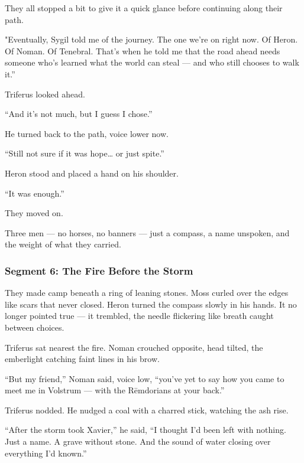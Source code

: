 \documentclass[9pt]{article}
\begin{document}
They all stopped a bit to give it a quick glance before continuing along their path.

"Eventually, Sygil told me of the journey. The one we're on right now. Of Heron. Of Noman. Of Tenebral. That's when he told me that the road ahead needs someone who’s learned what the world can steal — and who still chooses to walk it.”

\vspace{1em}

Triferus looked ahead.

“And it's not much, but I guess I chose.”

He turned back to the path, voice lower now.

“Still not sure if it was hope… or just spite.”

\vspace{1em}

Heron stood and placed a hand on his shoulder.

“It was enough.”

\vspace{1em}

They moved on.

Three men — no horses, no banners — just a compass, a name unspoken, and the weight of what they carried.

\newpage

\subsubsection*{Segment 6: The Fire Before the Storm}
They made camp beneath a ring of leaning stones. Moss curled over the edges like scars that never closed. Heron turned the compass slowly in his hands. It no longer pointed true — it trembled, the needle flickering like breath caught between choices.

Triferus sat nearest the fire. Noman crouched opposite, head tilted, the emberlight catching faint lines in his brow.

“But my friend,” Noman said, voice low, “you’ve yet to say how you came to meet me in Volstrum — with the Rēmdorians at your back.”

\vspace{1em}

Triferus nodded. He nudged a coal with a charred stick, watching the ash rise.

“After the storm took Xavier,” he said, “I thought I’d been left with nothing. Just a name. A grave without stone. And the sound of water closing over everything I’d known.”
\end{document}
